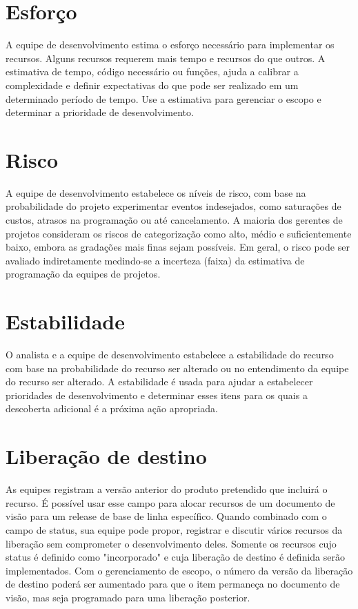 \documentclass{report}
\begin{document}
\section{Esforço}

A equipe de desenvolvimento estima o esforço necessário para implementar os
recursos. Alguns recursos requerem mais tempo e recursos do que outros. A
estimativa de tempo, código necessário ou funções, ajuda a calibrar a
complexidade e definir expectativas do que pode ser realizado em um determinado
período de tempo. Use a estimativa para gerenciar o escopo e determinar a
prioridade de desenvolvimento.

\section{Risco}

A equipe de desenvolvimento estabelece os níveis de risco, com base na
probabilidade do projeto experimentar eventos indesejados, como saturações de
custos, atrasos na programação ou até cancelamento. A maioria dos gerentes de
projetos consideram os riscos de categorização como alto, médio e
suficientemente baixo, embora as gradações mais finas sejam possíveis. Em
geral, o risco pode ser avaliado indiretamente medindo-se a incerteza (faixa)
da estimativa de programação da equipes de projetos.

\section{Estabilidade}

O analista e a equipe de desenvolvimento estabelece a estabilidade do recurso
com base na probabilidade do recurso ser alterado ou no entendimento da equipe
do recurso ser alterado. A estabilidade é usada para ajudar a estabelecer
prioridades de desenvolvimento e determinar esses itens para os quais a
descoberta adicional é a próxima ação apropriada.

\section{Liberação de destino}

As equipes registram a versão anterior do produto pretendido que incluirá o
recurso. É possível usar esse campo para alocar recursos de um documento de
visão para um release de base de linha específico. Quando combinado com o campo
de status, sua equipe pode propor, registrar e discutir vários recursos da
liberação sem comprometer o desenvolvimento deles. Somente os recursos cujo
status é definido como "incorporado" e cuja liberação de destino é definida
serão implementados. Com o gerenciamento de escopo, o número da versão da
liberação de destino poderá ser aumentado para que o item permaneça no
documento de visão, mas seja programado para uma liberação posterior.
\end{document}
